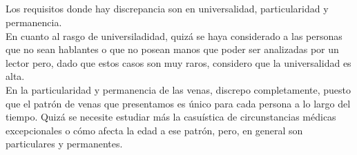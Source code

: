 \documentclass[10pt,a4paper]{article}
\begin{document}
\subsection{}
\begin{table}[htpb!]
  \caption{Bondad de los rasgos biométricos vasculares y de voz \cite{handbook}}
  \label{tabla:bondad2}
\end{table}
Los requisitos donde hay discrepancia son en universalidad, particularidad y permanencia.\\
En cuanto al rasgo de universiladidad, quizá se haya considerado a las personas que no sean hablantes o que no posean manos que poder ser analizadas por un lector pero, dado que estos casos son muy raros, considero que la universalidad es alta.\\
En la particularidad y permanencia de las venas, discrepo completamente, puesto que el patrón de venas que presentamos es único para cada persona a lo largo del tiempo. Quizá se necesite estudiar más la casuística de circunstancias médicas excepcionales o cómo afecta la edad a ese patrón, pero, en general son particulares y permanentes.

\section{}
\end{document}
